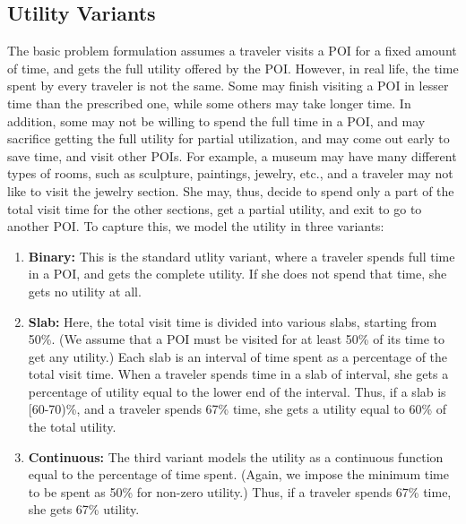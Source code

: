 \subsection{Utility Variants}
\label{sec:utility}

The basic problem formulation assumes a traveler visits a POI for a fixed amount
of time, and gets the full utility offered by the POI.  However, in real life,
the time spent by every traveler is not the same.  Some may finish visiting a
POI in lesser time than the prescribed one, while some others may take longer
time.  In addition, some may not be willing to spend the full time in a POI, and
may sacrifice getting the full utility for partial utilization, and may come out
early to save time, and visit other POIs.  For example, a museum may have many
different types of rooms, such as sculpture, paintings, jewelry, etc., and a
traveler may not like to visit the jewelry section.  She may, thus, decide to
spend only a part of the total visit time for the other sections, get a partial
utility, and exit to go to another POI.  To capture this, we model the utility
in three variants:

\begin{enumerate}

	\item \textbf{Binary:} This is the standard utlity variant, where a
		traveler spends full time in a POI, and gets the complete utility.
		If she does not spend that time, she gets no utility at all. 

	\item \textbf{Slab:} Here, the total visit time is divided into various
		slabs, starting from 50\%.  (We assume that a POI must be visited
		for at least 50\% of its time to get any utility.) Each slab is an
		interval of time spent as a percentage of the total visit time.
		When a traveler spends time in a slab of interval, she gets a
		percentage of utility equal to the lower end of the interval.
		Thus, if a slab is [60-70)\%, and a traveler spends 67\% time, she
		gets a utility equal to 60\% of the total utility.

	\item \textbf{Continuous:} The third variant models the utility as a
		continuous function equal to the percentage of time spent.  (Again,
		we impose the minimum time to be spent as 50\% for non-zero
		utility.) Thus, if a traveler spends 67\% time, she gets 67\%
		utility.

\end{enumerate}

